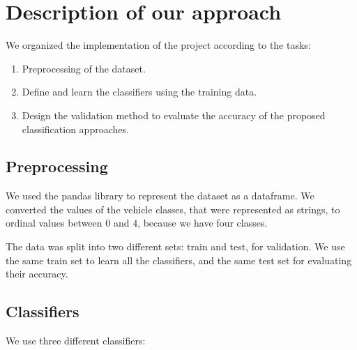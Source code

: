 \documentclass{article} %
\begin{document}
\section{Description of our approach}
  
 We organized the implementation of the project according to the tasks:

\begin{enumerate} 

 \item Preprocessing of the dataset.

 \item Define and learn the classifiers using the training data.

 \item  Design the validation method to evaluate the accuracy of the proposed classification approaches.  
\end{enumerate} 


\subsection{Preprocessing}

  We used the pandas library to represent the dataset as a dataframe. We converted the values of the vehicle classes, that were represented as strings, to ordinal values between $0$ and $4$, because we have four classes.

  The data was split into two different sets: train and test, for validation. We use the same train set to learn all the classifiers, and the same test set for evaluating their accuracy.


\subsection{Classifiers}

 We use three different classifiers:
\end{document}
